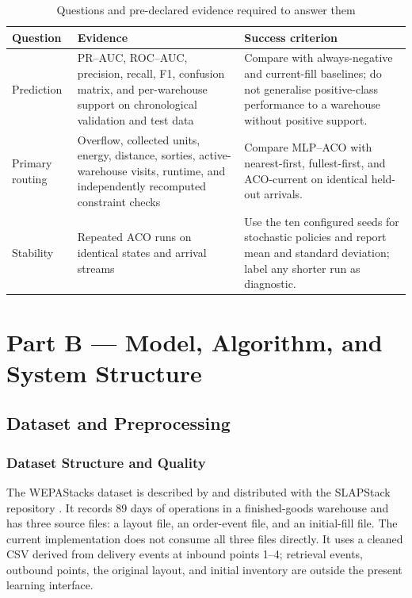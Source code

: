 \documentclass[10pt]{article}
\begin{document}
\begin{table}[H]
\centering
\caption{Questions and pre-declared evidence required to answer them}
\label{tab:success-criteria}
\small
\begin{tabularx}{\textwidth}{p{}YY}
\toprule
Question & Evidence & Success criterion \\
\midrule
Prediction & PR--AUC, ROC--AUC, precision, recall, F1, confusion matrix, and per-warehouse support on chronological validation and test data & Compare with always-negative and current-fill baselines; do not generalise positive-class performance to a warehouse without positive support. \\
Primary routing & Overflow, collected units, energy, distance, sorties, active-warehouse visits, runtime, and independently recomputed constraint checks & Compare MLP--ACO with nearest-first, fullest-first, and ACO-current on identical held-out arrivals. \\
Stability & Repeated ACO runs on identical states and arrival streams & Use the ten configured seeds for stochastic policies and report mean and standard deviation; label any shorter run as diagnostic. \\
\bottomrule
\end{tabularx}
\end{table}

\section{Part B --- Model, Algorithm, and System Structure}

\subsection{Dataset and Preprocessing}

\subsubsection{Dataset Structure and Quality}

The WEPAStacks dataset is described by \citet{pfrommer2022} and distributed with the SLAPStack repository \citep{rinciog2023}. It records 89 days of operations in a finished-goods warehouse and has three source files: a layout file, an order-event file, and an initial-fill file. The current implementation does not consume all three files directly. It uses a cleaned CSV derived from delivery events at inbound points 1--4; retrieval events, outbound points, the original layout, and initial inventory are outside the present learning interface.
\end{document}

